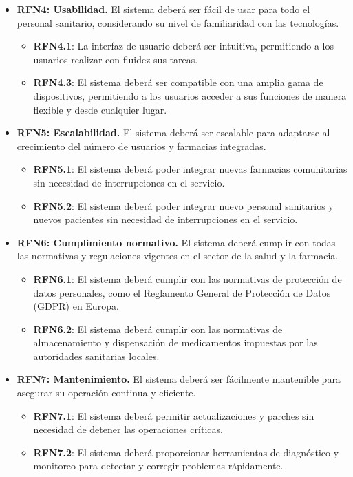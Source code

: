 \begin{itemize}
	\item \textbf{RFN4: Usabilidad.} El sistema deberá ser fácil de usar para todo el personal sanitario, considerando su nivel de familiaridad con las tecnologías.
	
	\begin{itemize}
		\item \textbf{RFN4.1}: La interfaz de usuario deberá ser intuitiva, permitiendo a los usuarios realizar con fluidez sus tareas.
		\item \textbf{RFN4.3}: El sistema deberá ser compatible con una amplia gama de dispositivos, permitiendo a los usuarios acceder a sus funciones de manera flexible y desde cualquier lugar.
	\end{itemize}
	
	\item \textbf{RFN5: Escalabilidad.} El sistema deberá ser escalable para adaptarse al crecimiento del número de usuarios y farmacias integradas.
	
	\begin{itemize}
		\item \textbf{RFN5.1}: El sistema deberá poder integrar nuevas farmacias comunitarias sin necesidad de interrupciones en el servicio.
		\item \textbf{RFN5.2}: El sistema deberá poder integrar nuevo personal sanitarios y nuevos pacientes sin necesidad de interrupciones en el servicio.
	\end{itemize}
	
	\item \textbf{RFN6: Cumplimiento normativo.} El sistema deberá cumplir con todas las normativas y regulaciones vigentes en el sector de la salud y la farmacia.
	
	\begin{itemize}
		\item \textbf{RFN6.1}: El sistema deberá cumplir con las normativas de protección de datos personales, como el Reglamento General de Protección de Datos (GDPR) en Europa.
		\item \textbf{RFN6.2}: El sistema deberá cumplir con las normativas de almacenamiento y dispensación de medicamentos impuestas por las autoridades sanitarias locales.
	\end{itemize}
	
	\item \textbf{RFN7: Mantenimiento.} El sistema deberá ser fácilmente mantenible para asegurar su operación continua y eficiente.
	
	\begin{itemize}
		\item \textbf{RFN7.1}: El sistema deberá permitir actualizaciones y parches sin necesidad de detener las operaciones críticas.
		\item \textbf{RFN7.2}: El sistema deberá proporcionar herramientas de diagnóstico y monitoreo para detectar y corregir problemas rápidamente.
	\end{itemize}
	
\end{itemize}


